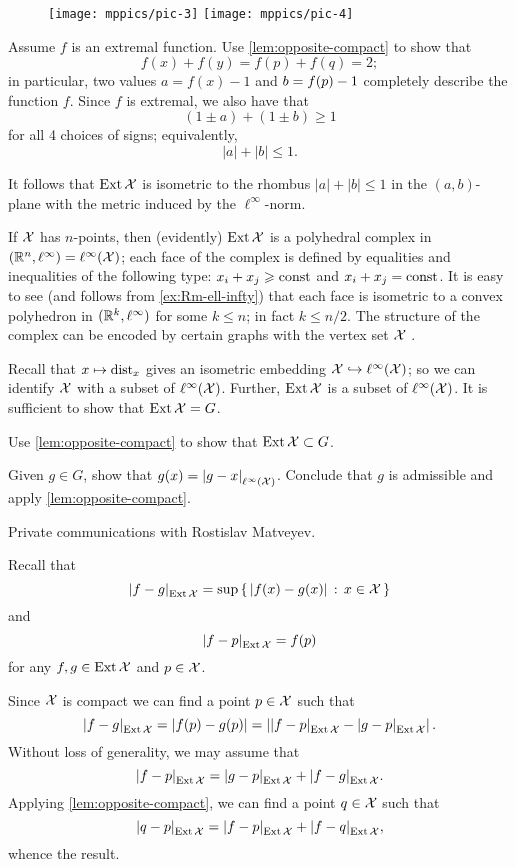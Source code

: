 \begin{wrapfigure}{r}{27 mm}
\vskip-0mm
\centering
\texttt{[image: mppics/pic-3]}
\bigskip
\texttt{[image: mppics/pic-4]}
\end{wrapfigure}

Assume $f$ is an extremal function.
Use \ref{lem:opposite-compact} to show that
\[f(x)+f(y)=f(p)+f(q)=2;\]
in particular, two values $a=f(x)-1$ and $b\z=f(p)-1$ completely describe the function $f$.
Since $f$ is extremal, we also have that 
\[(1\pm a)+(1\pm b)\ge 1\]
for all 4 choices of signs;
equivalently, 
\[|a|+|b|\le 1.\]

It follows that $\mathop{\rm Ext}\nolimits\mathcal{X}$ is isometric to the rhombus $|a|+|b|\le 1$ in the $(a,b)$-plane with the metric induced by the $\ell^\infty$-norm.

If $\mathcal{X}$ has $n$-points, then (evidently) $\mathop{\rm Ext}\nolimits\mathcal{X}$ is a polyhedral complex in $(\mathbb{R}^n,\ell^\infty) =\ell^\infty(\mathcal{X})$;
each face of the complex is defined by equalities and inequalities of the following type: $x_i+x_j\geqslant \operatorname{\rm const}\nolimits$ and  $x_i+x_j= \operatorname{\rm const}\nolimits$.
It is easy to see (and follows from \ref{ex:Rm-ell-infty}) that each face is isometric to a convex polyhedron in  $(\mathbb{R}^k,\ell^\infty)$ for some $k\le n$;
in fact $k\le n/2$.
The structure of the complex can be encoded by certain graphs with the vertex set $\mathcal{X}$ \cite[see Section 4 in][]{lang-2013}.

Recall that $x\mapsto \mathrm{dist}_x$ gives an isometric embedding $\spc{X}\z\hookrightarrow\ell^\infty(\spc{X})$;
so we can identify $\mathcal{X}$ with a subset of $\ell^\infty(\mathcal{X})$.
Further, $\mathop{\rm Ext}\nolimits\mathcal{X}$ is a subset of $\ell^\infty(\mathcal{X})$.
It is sufficient to show that $\mathop{\rm Ext}\nolimits\mathcal{X}=G$.

Use \ref{lem:opposite-compact} to show that $\mathop{\rm Ext}\nolimits\mathcal{X}\subset G$.

Given $g\in G$, show that $g(x)=\dist{g}{x}{\ell^\infty(\spc{X})}$.
Conclude that $g$ is admissible and apply \ref{lem:opposite-compact}.

 Private communications with Rostislav Matveyev.

Recall that 
\[\dist{f}{g}{\Inj\spc{X}}=\sup\set{|f(x)-g(x)|}{x\in\spc{X}}\]
and 
\[\dist{f}{p}{\Inj\spc{X}}=f(p)\]
for any $f,g\in \mathop{\rm Ext}\nolimits\mathcal{X}$ and $p\in \mathcal{X}$.

Since $\mathcal{X}$ is compact we can find a point $p\in\mathcal{X}$ such that 
\[\dist{f}{g}{\Inj\spc{X}}=|f(p)-g(p)|=\left|\dist{f}{p}{\Inj\spc{X}}-\dist{g}{p}{\Inj\spc{X}}\right|.\]
Without loss of generality, we may assume that 
\[\dist{f}{p}{\Inj\spc{X}}
=
\dist{g}{p}{\Inj\spc{X}}
+
\dist{f}{g}{\Inj\spc{X}}.\]
Applying \ref{lem:opposite-compact}, we can find a point $q\in\mathcal{X}$ such that 
\[\dist{q}{p}{\Inj\spc{X}}
=
\dist{f}{p}{\Inj\spc{X}}
+
\dist{f}{q}{\Inj\spc{X}},\]
whence the result.

